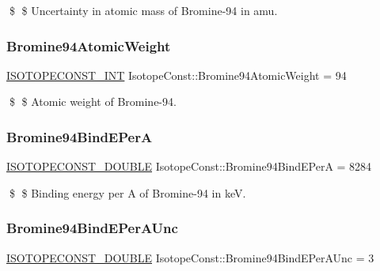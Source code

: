 \$ \$ Uncertainty in atomic mass of Bromine-\/94 in amu. \mbox{\label{group___isotope_const-_bromine-_br94_gafd73235a2487275c5ab549c643838c25}} 
\subsubsection{\texorpdfstring{Bromine94\+Atomic\+Weight}{Bromine94AtomicWeight}}
{\footnotesize\ttfamily \mbox{\hyperlink{group___isotope_const-_macros_ga5f18360b3e99483a35c32d789e62621c}{I\+S\+O\+T\+O\+P\+E\+C\+O\+N\+S\+T\+\_\+\+I\+NT}} Isotope\+Const\+::\+Bromine94\+Atomic\+Weight = 94}

\$ \$ Atomic weight of Bromine-\/94. \mbox{\label{group___isotope_const-_bromine-_br94_gad91383078b2e0f95baba882cf2662e21}} 
\subsubsection{\texorpdfstring{Bromine94\+Bind\+E\+PerA}{Bromine94BindEPerA}}
{\footnotesize\ttfamily \mbox{\hyperlink{group___isotope_const-_macros_ga8f45a7272ce02c0b4c65c44636ed719a}{I\+S\+O\+T\+O\+P\+E\+C\+O\+N\+S\+T\+\_\+\+D\+O\+U\+B\+LE}} Isotope\+Const\+::\+Bromine94\+Bind\+E\+PerA = 8284}

\$ \$ Binding energy per A of Bromine-\/94 in keV. \mbox{\label{group___isotope_const-_bromine-_br94_ga727dad19e61df6fedd715d23715f8c75}} 
\subsubsection{\texorpdfstring{Bromine94\+Bind\+E\+Per\+A\+Unc}{Bromine94BindEPerAUnc}}
{\footnotesize\ttfamily \mbox{\hyperlink{group___isotope_const-_macros_ga8f45a7272ce02c0b4c65c44636ed719a}{I\+S\+O\+T\+O\+P\+E\+C\+O\+N\+S\+T\+\_\+\+D\+O\+U\+B\+LE}} Isotope\+Const\+::\+Bromine94\+Bind\+E\+Per\+A\+Unc = 3}

